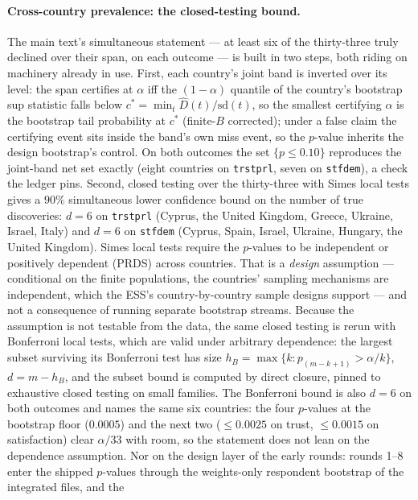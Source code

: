 \documentclass[12pt]{article}
\theoremstyle{definition}
\theoremstyle{remark}
\begin{document}
\paragraph{Cross-country prevalence: the closed-testing bound.} The main text's simultaneous statement --- at least six of the
thirty-three truly declined over their span, on each outcome --- is built in
two steps, both riding on machinery already in use. First, each country's joint
band is inverted over its level: the span certifies at $\alpha$ iff the
$(1-\alpha)$ quantile of the country's bootstrap sup statistic falls below
$c^*=\min_t \widehat D(t)/\mathrm{sd}(t)$, so the smallest certifying $\alpha$
is the bootstrap tail probability at $c^*$ (finite-$B$ corrected); under a
false claim the certifying event sits inside the band's own miss event, so the
$p$-value inherits the design bootstrap's control. On both outcomes the set
$\{p\le0.10\}$ reproduces the joint-band net set exactly (eight countries on
\texttt{trstprl}, seven on \texttt{stfdem}), a check the ledger pins. Second,
closed testing over the thirty-three with Simes local tests
\citep{goeman2011multiple} gives a $90\%$ simultaneous lower confidence
bound on the number of true discoveries: $d=6$ on \texttt{trstprl} (Cyprus,
the United Kingdom, Greece, Ukraine, Israel, Italy) and $d=6$ on
\texttt{stfdem} (Cyprus, Spain, Israel, Ukraine, Hungary, the United
Kingdom). Simes local tests require the $p$-values to be independent or
positively dependent (PRDS) across countries. That is a \emph{design}
assumption --- conditional on the finite populations, the countries'
sampling mechanisms are independent, which the ESS's country-by-country
sample designs support --- and not a consequence of running separate
bootstrap streams. Because the assumption is not testable from the data, the
same closed testing is rerun with Bonferroni local tests, which are valid
under arbitrary dependence: the largest subset surviving its Bonferroni test
has size $h_B=\max\{k: p_{(m-k+1)}>\alpha/k\}$, $d=m-h_B$, and the subset
bound is computed by direct closure, pinned to exhaustive closed testing on
small families. The Bonferroni bound is
also $d=6$ on both outcomes and names the same six countries: the four
$p$-values at the bootstrap floor ($0.0005$) and the next two ($\le0.0025$
on trust, $\le0.0015$ on satisfaction) clear $\alpha/33$ with room, so the
statement does not lean on the dependence assumption. Nor on the design
layer of the early rounds: rounds 1--8 enter the shipped $p$-values through
the weights-only respondent bootstrap of the integrated files, and the
\end{document}
